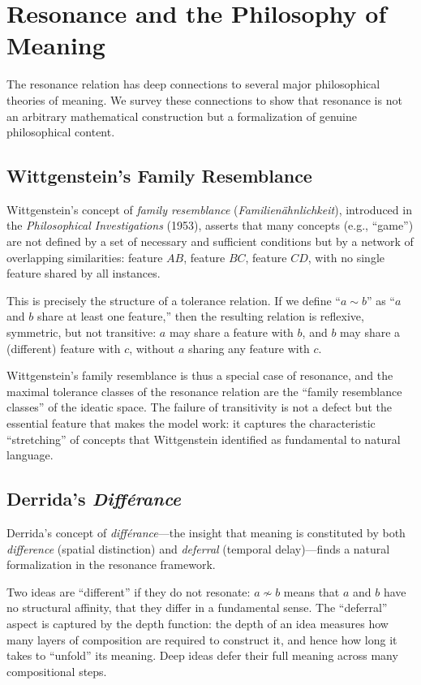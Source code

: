 \documentclass[11pt,openany]{book}
\theoremstyle{definition}
\theoremstyle{plain}
\theoremstyle{remark}
\newcommand{\res}{\sim}                      %
\begin{document}
\section{Resonance and the Philosophy of Meaning}

The resonance relation has deep connections to several major philosophical theories of meaning. We survey these connections to show that resonance is not an arbitrary mathematical construction but a formalization of genuine philosophical content.

\subsection{Wittgenstein's Family Resemblance}

Wittgenstein's concept of \emph{family resemblance} (\emph{Familien\"ahnlichkeit}), introduced in the \emph{Philosophical Investigations} (1953), asserts that many concepts (e.g., ``game'') are not defined by a set of necessary and sufficient conditions but by a network of overlapping similarities: feature $AB$, feature $BC$, feature $CD$, with no single feature shared by all instances.

This is precisely the structure of a tolerance relation. If we define ``$a \res b$'' as ``$a$ and $b$ share at least one feature,'' then the resulting relation is reflexive, symmetric, but not transitive: $a$ may share a feature with $b$, and $b$ may share a (different) feature with $c$, without $a$ sharing any feature with $c$.

Wittgenstein's family resemblance is thus a special case of resonance, and the maximal tolerance classes of the resonance relation are the ``family resemblance classes'' of the ideatic space. The failure of transitivity is not a defect but the essential feature that makes the model work: it captures the characteristic ``stretching'' of concepts that Wittgenstein identified as fundamental to natural language.

\subsection{Derrida's \emph{Diff\'erance}}

Derrida's concept of \emph{diff\'erance}---the insight that meaning is constituted by both \emph{difference} (spatial distinction) and \emph{deferral} (temporal delay)---finds a natural formalization in the resonance framework.

Two ideas are ``different'' if they do not resonate: $a \not\res b$ means that $a$ and $b$ have no structural affinity, that they differ in a fundamental sense. The ``deferral'' aspect is captured by the depth function: the depth of an idea measures how many layers of composition are required to construct it, and hence how long it takes to ``unfold'' its meaning. Deep ideas defer their full meaning across many compositional steps.
\end{document}
